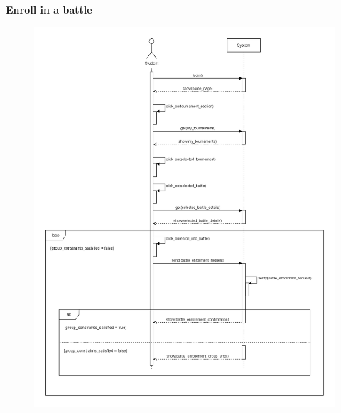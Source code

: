 \documentclass[../RASD.tex]{subfiles}
\begin{document}
    \textbf{Enroll in a battle}
    \begin{figure}[h!]
        \centering
        \includegraphics[width=1\textwidth]{../assets/section_3/EnrollInABattle.png}
    \end{figure}
    \newpage
    \restoregeometry
\end{document}
